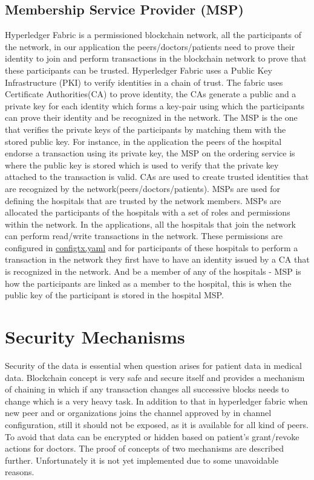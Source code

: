 \subsection{Membership Service Provider (MSP)}
Hyperledger Fabric is a permissioned blockchain network, all the participants of the network, in our application the peers/doctors/patients need to prove their identity to join and perform transactions in the blockchain network to prove that these participants can be trusted. Hyperledger Fabric uses a Public Key Infrastructure (PKI) \cite{MSP} to verify identities in a chain of trust. The fabric uses Certificate Authorities(CA) to prove identity, the CAs generate a public and a private key for each identity which forms a key-pair using which the participants can prove their identity and be recognized in the network. The MSP is the one that verifies the private keys of the participants by matching them with the stored public key. For instance, in the application the peers of the hospital endorse a transaction using its private key, the MSP on the ordering service is where the public key is stored which is used to verify that the private key attached to the transaction is valid. CAs are used to create trusted identities that are recognized by the network(peers/doctors/patients). MSPs are used for defining the hospitals that are trusted by the network members. MSPs are allocated the participants of the hospitals with a set of roles and permissions within the network. In the applications, all the hospitals that join the network can perform read/write transactions in the network. These permissions are configured in \href{https://github.com/kshitijyelpale/blockchain-hyperledger-fabric-electronic-patient-records/blob/main/app/first-network/configtx/configtx.yaml}{configtx.yaml} and for participants of these hospitals to perform a transaction in the network they first have to have an identity issued by a CA that is recognized in the network. And be a member of any of the hospitals - MSP is how the participants are linked as a member to the hospital, this is when the public key of the participant is stored in the hospital MSP.

%
%
\section{Security Mechanisms}
\label{sec:thesolution:securitymechanisms}
Security of the data is essential when question arises for patient data in medical data. Blockchain concept is very safe and secure itself and provides a mechanism of chaining in which if any transaction changes all successive blocks needs to change which is a very heavy task. In addition to that in hyperledger fabric when new peer and or organizations joins the channel approved by in channel configuration, still it should not be exposed, as it is available for all kind of peers. To avoid that data can be encrypted or hidden based on patient's grant/revoke actions for doctors. The proof of concepts of two mechanisms are described further. Unfortunately it is not yet implemented due to some unavoidable reasons. 

